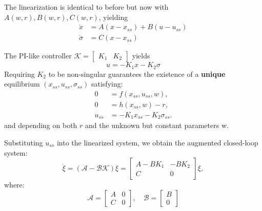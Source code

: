\newpar{}

The linearization is identical to before but now with $A(w, r), B(w, r), C(w, r)$, yielding
\begin{align*}
    \dot{x}      & = A(x - x_{ss}) + B(u - u_{ss}) \\
    \dot{\sigma} & = C(x - x_{ss})
\end{align*}

\newpar{}

The PI-like controller $\mathcal{K} = \begin{bmatrix} K_1 & K_2 \end{bmatrix}$ yields
\begin{equation*}
    u = -K_1 x - K_2 \sigma
\end{equation*}
Requiring $K_2$ to be non-singular guarantees the existence of a \textbf{unique} equilibrium $(x_{ss}, u_{ss}, \sigma_{ss})$ satisfying:
\begin{align*}
    0      & = f(x_{ss}, u_{ss}, w),          \\
    0      & = h(x_{ss}, w) - r,              \\
    u_{ss} & = -K_1 x_{ss} - K_2 \sigma_{ss}.
\end{align*}
and depending on both $r$ and the unknown but constant parameters w.

\newpar{}

Substituting $u_{ss}$ into the linearized system, we obtain the augmented closed-loop system:
\begin{equation*}
    \dot{\xi} = (\mathcal{A} - \mathcal{BK})\xi = \begin{bmatrix} A - BK_1 & -BK_2 \\ C & 0 \end{bmatrix} \xi,
\end{equation*}
where:
\begin{equation*}
    \mathcal{A} = \begin{bmatrix} A & 0 \\ C & 0 \end{bmatrix},\quad \mathcal{B} = \begin{bmatrix} B \\ 0 \end{bmatrix}
\end{equation*}

\newpar{}

